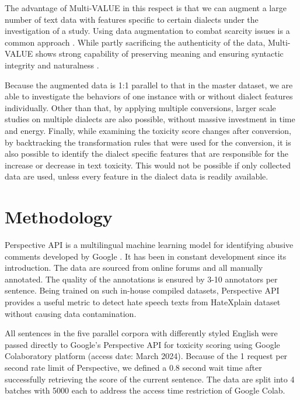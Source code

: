 \documentclass[11pt]{article}
\begin{document}
The advantage of Multi-VALUE in this respect is that we can augment a large number of text data with features specific to certain dialects under the investigation of a study. Using data augmentation to combat scarcity issues is a common approach \citep{bird-2020-augmentation}. While partly sacrificing the authenticity of the data, Multi-VALUE shows strong capability of preserving meaning and ensuring syntactic integrity and naturalness \citep{ziems-2022-value, ziems-2023-multi}.

Because the augmented data is 1:1 parallel to that in the master dataset, we are able to investigate the behaviors of one instance with or without dialect features individually. Other than that, by applying multiple conversions, larger scale studies on multiple dialects are also possible, without massive investment in time and energy. Finally, while examining the toxicity score changes after conversion, by backtracking the transformation rules that were used for the conversion, it is also possible to identify the dialect specific features that are responsible for the increase or decrease in text toxicity. This would not be possible if only collected data are used, unless every feature in the dialect data is readily available.

\section{Methodology}

Perspective API is a multilingual machine learning model for identifying abusive comments developed by Google \citep{jigsaw-2017-perspective}. It has been in constant development since its introduction. The data are sourced from online forums and all manually annotated. The quality of the annotations is ensured by 3-10 annotators per sentence. Being trained on such in-house compiled datasets, Perspective API provides a useful metric to detect hate speech texts from HateXplain dataset without causing data contamination.

All sentences in the five parallel corpora with differently styled English were passed directly to Google’s Perspective API for toxicity scoring using Google Colaboratory platform (access date: March 2024). Because of the 1 request per second rate limit of Perspective, we defined a 0.8 second wait time after successfully retrieving the score of the current sentence. The data are split into 4 batches with 5000 each to address the access time restriction of Google Colab.
\end{document}
